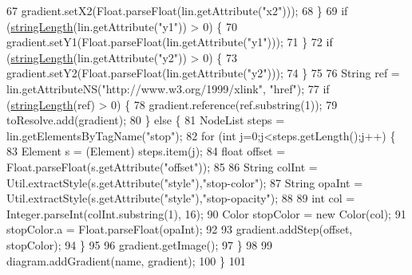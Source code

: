 \begin{DoxyCode}
67                 gradient.setX2(Float.parseFloat(lin.getAttribute(\textcolor{stringliteral}{"x2"})));
68             \}
69             \textcolor{keywordflow}{if} (\mbox{\hyperlink{classorg_1_1newdawn_1_1slick_1_1svg_1_1inkscape_1_1_defs_processor_ab7a770c192ded7ccb0655791369c2475}{stringLength}}(lin.getAttribute(\textcolor{stringliteral}{"y1"})) > 0) \{
70                 gradient.setY1(Float.parseFloat(lin.getAttribute(\textcolor{stringliteral}{"y1"})));
71             \}
72             \textcolor{keywordflow}{if} (\mbox{\hyperlink{classorg_1_1newdawn_1_1slick_1_1svg_1_1inkscape_1_1_defs_processor_ab7a770c192ded7ccb0655791369c2475}{stringLength}}(lin.getAttribute(\textcolor{stringliteral}{"y2"})) > 0) \{
73                 gradient.setY2(Float.parseFloat(lin.getAttribute(\textcolor{stringliteral}{"y2"})));
74             \}
75             
76             String ref = lin.getAttributeNS(\textcolor{stringliteral}{"http://www.w3.org/1999/xlink"}, \textcolor{stringliteral}{"href"});
77             \textcolor{keywordflow}{if} (\mbox{\hyperlink{classorg_1_1newdawn_1_1slick_1_1svg_1_1inkscape_1_1_defs_processor_ab7a770c192ded7ccb0655791369c2475}{stringLength}}(ref) > 0) \{
78                 gradient.reference(ref.substring(1));
79                 toResolve.add(gradient);
80             \} \textcolor{keywordflow}{else} \{
81                 NodeList steps = lin.getElementsByTagName(\textcolor{stringliteral}{"stop"});
82                 \textcolor{keywordflow}{for} (\textcolor{keywordtype}{int} j=0;j<steps.getLength();j++) \{
83                     Element s = (Element) steps.item(j);
84                     \textcolor{keywordtype}{float} offset = Float.parseFloat(s.getAttribute(\textcolor{stringliteral}{"offset"}));
85         
86                     String colInt = Util.extractStyle(s.getAttribute(\textcolor{stringliteral}{"style"}),\textcolor{stringliteral}{"stop-color"});
87                     String opaInt = Util.extractStyle(s.getAttribute(\textcolor{stringliteral}{"style"}),\textcolor{stringliteral}{"stop-opacity"});
88                     
89                     \textcolor{keywordtype}{int} col = Integer.parseInt(colInt.substring(1), 16);
90                     Color stopColor = \textcolor{keyword}{new} Color(col);
91                     stopColor.a = Float.parseFloat(opaInt);
92                     
93                     gradient.addStep(offset, stopColor);
94                 \}
95                 
96                 gradient.getImage();
97             \}
98             
99             diagram.addGradient(name, gradient);
100         \}
101         

\end{DoxyCode}
